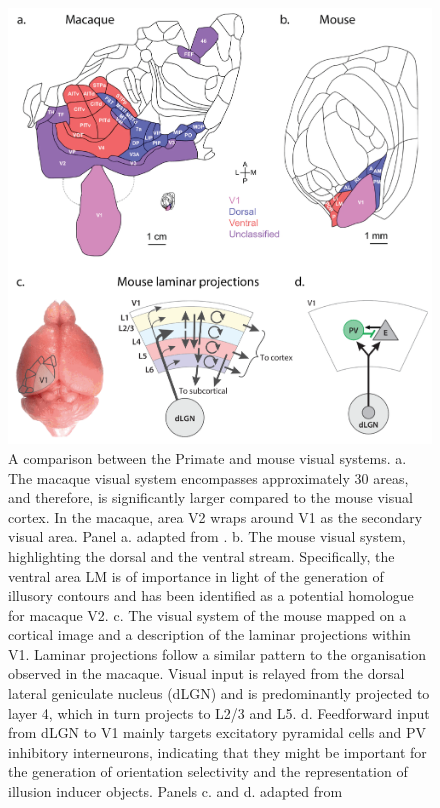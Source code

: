 \documentclass[12pt]{article}
\begin{document}
\vspace*{-2.5cm}
\begin{figure}[H]
  \centering
  \includegraphics[width=1.0 \textwidth]{adjusted_figures/Laminar_Figure.png}
  \caption{A comparison between the Primate and mouse visual systems. a. The macaque visual system encompasses approximately 30 areas, and therefore, is significantly larger compared to the mouse visual cortex. In the macaque, area V2 wraps around V1 as the secondary visual area. Panel a. adapted from \textcite{gamanutAnatomicalFunctionalConnectomes2022}. b. The mouse visual system, highlighting the dorsal and the ventral stream. Specifically, the ventral area LM is of importance in light of the generation of illusory contours and has been identified as a potential homologue for macaque V2. c. The visual system of the mouse mapped on a cortical image and a description of the laminar projections within V1.  Laminar projections follow a similar pattern to the organisation observed in the macaque. Visual input is relayed from the dorsal lateral geniculate nucleus (dLGN) and is predominantly projected to layer 4, which in turn projects to L2/3 and L5. d. Feedforward input from dLGN to V1 mainly targets excitatory pyramidal cells and PV inhibitory interneurons, indicating that they might be important for the generation of orientation selectivity and the representation of illusion inducer objects. Panels c. and d. adapted from \textcite{niellHowCorticalCircuits2021}}
  \label{fig:Laminar_Figure}
\end{figure}
\end{document}
